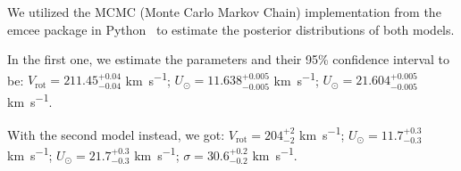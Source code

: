We utilized the MCMC (Monte Carlo Markov Chain) implementation from the emcee package in Python~\cite{EMCEE} to estimate the posterior distributions of both models.

In the first one, we estimate the parameters and their 95\% confidence interval to be: %
$V_{\text{rot}} = 211.45_{-0.04}^{+0.04}$ \unit{\kilo\meter\per\second};  
$U_{\odot} = 11.638_{-0.005}^{+0.005}$ \unit{\kilo\meter\per\second};  
$U_{\odot} = 21.604_{-0.005}^{+0.005}$ \unit{\kilo\meter\per\second}.  

With the second model instead, we got:  
$V_{\text{rot}} = 204_{-2}^{+2}$ \unit{\kilo\meter\per\second};  
$U_{\odot} = 11.7_{-0.3}^{+0.3}$ \unit{\kilo\meter\per\second};  
$U_{\odot} = 21.7_{-0.3}^{+0.3}$ \unit{\kilo\meter\per\second};  
$\sigma = 30.6_{-0.2}^{+0.2}$ \unit{\kilo\meter\per\second}.  

